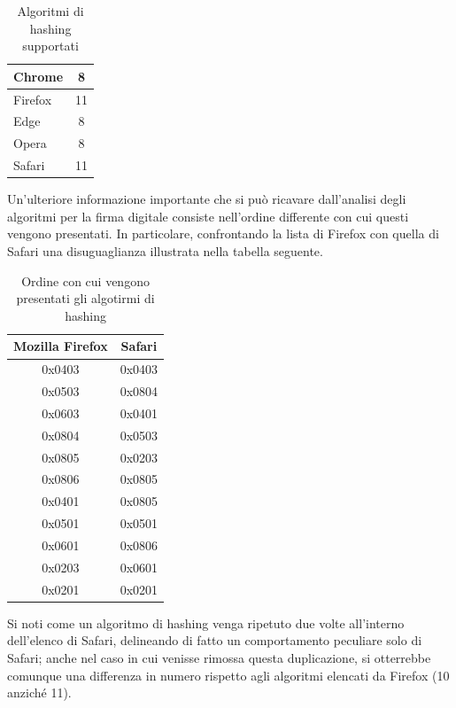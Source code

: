 \begin{table}[H]
	\centering
	\begin{tabular}{| l | c |}
		\hline
		\rowcolor[HTML]{FDD20A}Chrome & 8
		\\
		\hline
		\rowcolor[HTML]{FF9500}Firefox & 11
		\\
		\hline
		\rowcolor[HTML]{3277BC}Edge & 8
		\\
		\hline
		\rowcolor[HTML]{CB0B1E}Opera & 8
		\\
		\hline
		\rowcolor[HTML]{0FB5EE} Safari & 11
		\\
		\hline
		
	\end{tabular}
	\caption{Algoritmi di hashing supportati}
	\label{tab:hash}
\end{table}

Un'ulteriore informazione importante che si può ricavare dall'analisi degli algoritmi per la firma digitale consiste nell'ordine differente con cui questi vengono presentati. In particolare, confrontando la lista di Firefox con quella di Safari una disuguaglianza illustrata nella tabella seguente.

\begin{table}[H]
	\centering
	\begin{tabular}{| c | c |}
		\hline
		Mozilla Firefox & Safari
		\\
		\hline
		0x0403 & 0x0403
		\\
		\hline
		0x0503 & 0x0804
		\\
		\hline
		0x0603 & 0x0401
		\\
		\hline
		0x0804 & 0x0503
		\\
		\hline
		0x0805 & 0x0203
		\\
		\hline
		0x0806 & \cellcolor{red!10}0x0805
		\\
		\hline
		0x0401 & \cellcolor{red!10}0x0805
		\\
		\hline
		0x0501 & 0x0501
		\\
		\hline
		0x0601 & 0x0806
		\\
		\hline
		0x0203 & 0x0601
		\\
		\hline
		0x0201 & 0x0201
		\\
		\hline
		
	\end{tabular}
	\caption{Ordine con cui vengono presentati gli algotirmi di hashing}
	\label{tab:hashing}
\end{table}

Si noti come un algoritmo di hashing venga ripetuto due volte all'interno dell'elenco di Safari, delineando di fatto un comportamento peculiare solo di Safari; anche nel caso in cui venisse rimossa questa duplicazione, si otterrebbe comunque una differenza in numero rispetto agli algoritmi elencati da Firefox (10 anziché 11).

